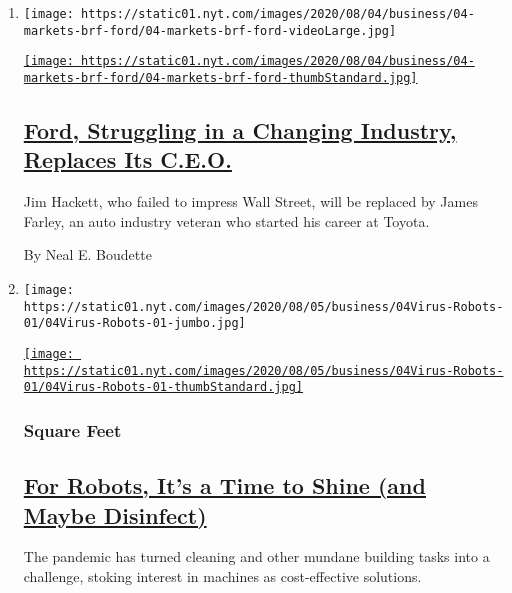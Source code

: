 \begin{enumerate}
\def\labelenumi{\arabic{enumi}.}
\item
  \texttt{[image: https://static01.nyt.com/images/2020/08/04/business/04-markets-brf-ford/04-markets-brf-ford-videoLarge.jpg]}

  \href{/2020/08/04/business/ford-jim-hackett-james-farley.html}{\texttt{[image: https://static01.nyt.com/images/2020/08/04/business/04-markets-brf-ford/04-markets-brf-ford-thumbStandard.jpg]}}

  \hypertarget{ford-struggling-in-a-changing-industry-replaces-its-ceo}{%
  \subsection{\texorpdfstring{\href{/2020/08/04/business/ford-jim-hackett-james-farley.html}{Ford,
  Struggling in a Changing Industry, Replaces Its
  C.E.O.}}{Ford, Struggling in a Changing Industry, Replaces Its C.E.O.}}\label{ford-struggling-in-a-changing-industry-replaces-its-ceo}}

  Jim Hackett, who failed to impress Wall Street, will be replaced by
  James Farley, an auto industry veteran who started his career at
  Toyota.

  By Neal E. Boudette
\item
  \texttt{[image: https://static01.nyt.com/images/2020/08/05/business/04Virus-Robots-01/04Virus-Robots-01-jumbo.jpg]}

  \href{/2020/08/04/business/robot-cleaning-coronavirus.html}{\texttt{[image: https://static01.nyt.com/images/2020/08/05/business/04Virus-Robots-01/04Virus-Robots-01-thumbStandard.jpg]}}

  \hypertarget{square-feet}{%
  \subsubsection{Square Feet}\label{square-feet}}

  \hypertarget{for-robots-its-a-time-to-shine-and-maybe-disinfect}{%
  \subsection{\texorpdfstring{\href{/2020/08/04/business/robot-cleaning-coronavirus.html}{For
  Robots, It's a Time to Shine (and Maybe
  Disinfect)}}{For Robots, It's a Time to Shine (and Maybe Disinfect)}}\label{for-robots-its-a-time-to-shine-and-maybe-disinfect}}

  The pandemic has turned cleaning and other mundane building tasks into
  a challenge, stoking interest in machines as cost-effective solutions.


\end{enumerate}
